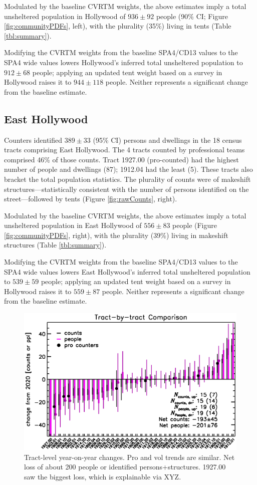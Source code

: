 \documentclass[11pt,twocolumn]{article}
\begin{document}
Modulated by the baseline CVRTM weights, the above estimates imply a total unsheltered
population in Hollywood of $936\pm92$ people (90\% CI; Figure \ref{fig:communityPDFs},
left), with the plurality (35\%) living in tents (Table \ref{tbl:summary}).

Modifying the CVRTM weights from the baseline SPA4/CD13 values to the SPA4 wide values 
lowers Hollywood's inferred total unsheltered population to $912\pm68$ people; applying
an updated tent weight based on a survey in Hollywood raises it to $944\pm118$ people.
Neither represents a significant change from the baseline estimate.

\subsection{East Hollywood}
\label{sec:eHo}

Counters identified $389\pm33$ (95\% CI) persons and dwellings in the 18 census tracts 
comprising East Hollywood. The 4 tracts counted by professional teams comprised 46\% of 
those counts. Tract 1927.00 (pro-counted) had the highest number of people and dwellings (87); 
1912.04 had the least (5). These tracts also bracket the total population statistics. The plurality
of counts were of makeshift structures---statistically consistent with the number of 
persons identified on the street---followed by tents (Figure \ref{fig:rawCounts}, right).

Modulated by the baseline CVRTM weights, the above estimates imply a total unsheltered
population in East Hollywood of $556\pm83$ people (Figure \ref{fig:communityPDFs},
right), with the plurality (39\%) living in makeshift structures (Table \ref{tbl:summary}).

Modifying the CVRTM weights from the baseline SPA4/CD13 values to the SPA4 wide values 
lowers East Hollywood's inferred total unsheltered population to $539\pm59$ people; applying
an updated tent weight based on a survey in Hollywood raises it to $559\pm87$ people.
Neither represents a significant change from the baseline estimate.

\begin{figure}[]
	\centering
	\includegraphics[width = 0.8\linewidth, trim = 0cm 0cm 0cm 0cm]{tractsYrYr}
	\caption{Tract-level year-on-year changes. Pro and vol trends are similar. Net loss of
			about 200 people or identified persons+structures. 1927.00 saw the biggest
			loss, which is explainable via XYZ.}
	\label{fig:tractYrYr}
\end{figure}
\end{document}
